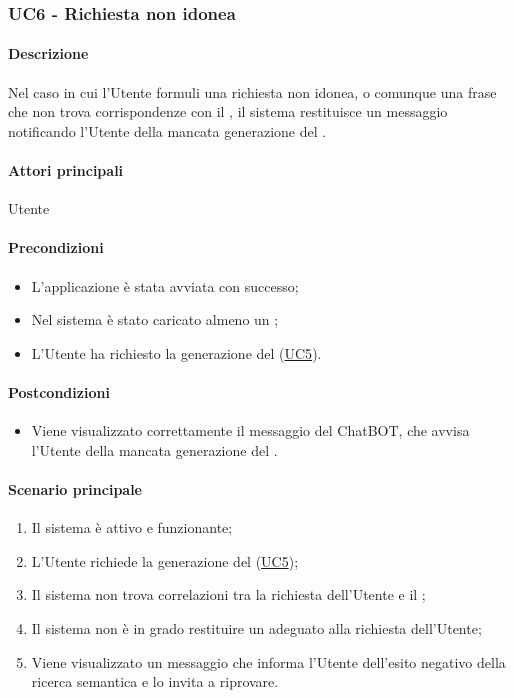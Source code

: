 \subsubsection{UC6 - Richiesta non idonea}\label{UC6}
\paragraph*{Descrizione}
Nel caso in cui l'Utente formuli una richiesta non idonea, o comunque una frase che non trova corrispondenze con il , il sistema restituisce un messaggio notificando l'Utente della mancata generazione del .

\paragraph*{Attori principali}
Utente

\paragraph*{Precondizioni}
\begin{itemize}
  \item L'applicazione è stata avviata con successo;
  \item Nel sistema è stato caricato almeno un ;
  \item L'Utente ha richiesto la generazione del  (\hyperref[UC5]{UC5}).  
\end{itemize}

\paragraph*{Postcondizioni}
\begin{itemize}
  \item Viene visualizzato correttamente il messaggio del ChatBOT, che avvisa l'Utente della mancata generazione del .
\end{itemize}

\paragraph*{Scenario principale}
\begin{enumerate}
  \item Il sistema è attivo e funzionante;
  \item L'Utente richiede la generazione del  (\hyperref[UC5]{UC5});
  \item Il sistema non trova correlazioni tra la richiesta dell'Utente e il ;
  \item Il sistema non è in grado restituire un  adeguato alla richiesta dell'Utente;
  \item Viene visualizzato un messaggio che informa l'Utente dell'esito negativo della ricerca semantica e lo invita a riprovare.
\end{enumerate}
